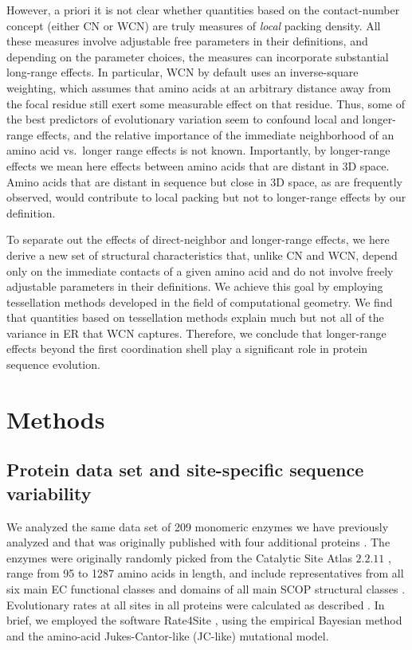\documentclass[12pt]{article}
\begin{document}
However, a priori it is not clear whether quantities based on the contact-number concept (either CN or WCN) are truly measures of \emph{local} packing density. All these measures involve adjustable free parameters in their definitions, and depending on the parameter choices, the measures can incorporate substantial long-range effects. In particular, WCN by default uses an inverse-square weighting, which assumes that amino acids at an arbitrary distance away from the focal residue still exert some measurable effect on that residue. Thus, some of the best predictors of evolutionary variation seem to confound local and longer-range effects, and the relative importance of the immediate neighborhood of an amino acid vs.\ longer range effects is not known. Importantly, by longer-range effects we mean here effects between amino acids that are distant in 3D space. Amino acids that are distant in sequence but close in 3D space, as are frequently observed\cite{plaxco_contact_1998,lai_sequence_2015}, would contribute to local packing but not to longer-range effects by our definition.


To separate out the effects of direct-neighbor and longer-range effects, we here derive a new set of structural characteristics that, unlike CN and WCN, depend only on the immediate contacts of a given amino acid and do not involve freely adjustable parameters in their definitions. We achieve this goal by employing tessellation methods developed in the field of computational geometry. We find that quantities based on tessellation methods explain much but not all of the variance in ER that WCN captures. Therefore, we conclude that longer-range effects beyond the first coordination shell play a significant role in protein sequence evolution.

\section*{Methods}

\subsection*{Protein data set and site-specific sequence variability}

We analyzed the same data set of 209 monomeric enzymes we have previously analyzed \cite{echave_relationship_2014} and that was originally published with four additional proteins \cite{yeh_site-specific_2014}. The enzymes were originally randomly picked from the Catalytic Site Atlas $2.2.11$ \cite{porter_catalytic_2004}, range from 95 to 1287 amino acids in length, and include representatives from all six main EC functional classes \cite{webb_enzyme_1992} and domains of all main SCOP structural classes \cite{murzin_scop:_1995}. Evolutionary rates at all sites in all proteins were calculated as described \cite{echave_relationship_2014}. In brief, we employed the software Rate4Site \cite{mayrose_comparison_2004}, using the empirical Bayesian method and the amino-acid Jukes-Cantor-like (JC-like) mutational model.
\end{document}

